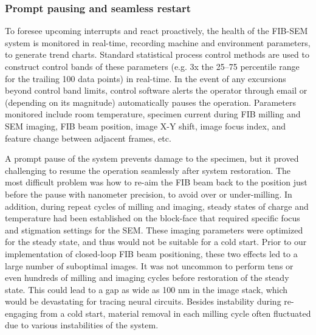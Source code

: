 \documentclass{article}
\begin{document}
\subsubsection*{Prompt pausing and seamless restart}

To foresee upcoming interrupts and react proactively, the health of the FIB-SEM system is monitored in real-time, recording machine and environment parameters, to generate trend charts. Standard statistical process control methods are used to construct control bands of these parameters (e.g. 3x the 25–75 percentile range for the trailing 100 data points) in real-time. In the event of any excursions beyond control band limits, control software alerts the operator through email or (depending on its magnitude) automatically pauses the operation. Parameters monitored include room temperature, specimen current during FIB milling and SEM imaging, FIB beam position, image X-Y shift, image focus index, and feature change between adjacent frames, etc.

A prompt pause of the system prevents damage to the specimen, but it proved challenging to resume the operation seamlessly after system restoration. The most difficult problem was how to re-aim the FIB beam back to the position just before the pause with nanometer precision, to avoid over or under-milling. In addition, during repeat cycles of milling and imaging, steady states of charge and temperature had been established on the block-face that required specific focus and stigmation settings for the SEM. These imaging parameters were optimized for the steady state, and thus would not be suitable for a cold start. Prior to our implementation of closed-loop FIB beam positioning, these two effects led to a large number of suboptimal images. It was not uncommon to perform tens or even hundreds of milling and imaging cycles before restoration of the steady state. This could lead to a gap as wide as 100 nm in the image stack, which would be devastating for tracing neural circuits. Besides instability during re-engaging from a cold start, material removal in each milling cycle often fluctuated due to various instabilities of the system.
\end{document}
